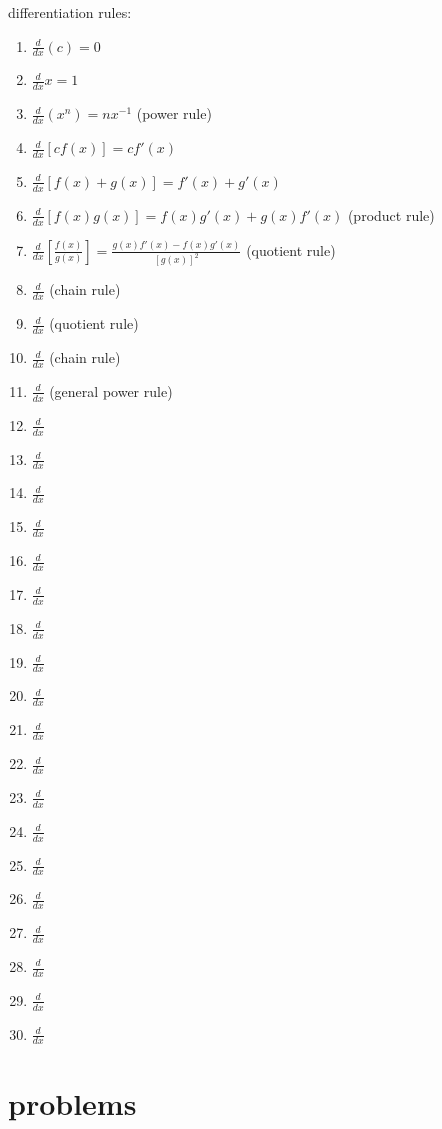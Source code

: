 \documentclass{article}
\begin{document}
differentiation rules:
	\begin{enumerate}
		\item$\frac{d}{dx}(c) = 0$
		\item$\frac{d}{dx}x = 1$
		\item$\frac{d}{dx}(x^n) = nx^{-1}$ (power rule)
		\item$\frac{d}{dx}[cf(x)] = cf'(x)$
		\item$\frac{d}{dx}[f(x)+g(x)] = f'(x) + g'(x)$
		\item$\frac{d}{dx}[f(x)g(x)] = f(x)g'(x) + g(x)f'(x)$ (product rule)
		\item$\frac{d}{dx}[\frac{f(x)}{g(x)}] = \frac{g(x)f'(x) - f(x)g'(x)}{[g(x)]^2}$ (quotient rule)
		\item$\frac{d}{dx}$ (chain rule)
		\item$\frac{d}{dx}$ (quotient rule)
		\item$\frac{d}{dx}$ (chain rule)
		\item$\frac{d}{dx}$ (general power rule)
		\item$\frac{d}{dx}$ 
		\item$\frac{d}{dx}$
		\item$\frac{d}{dx}$
		\item$\frac{d}{dx}$
		\item$\frac{d}{dx}$
		\item$\frac{d}{dx}$
		\item$\frac{d}{dx}$
		\item$\frac{d}{dx}$
		\item$\frac{d}{dx}$
		\item$\frac{d}{dx}$
		\item$\frac{d}{dx}$
		\item$\frac{d}{dx}$
		\item$\frac{d}{dx}$
		\item$\frac{d}{dx}$
		\item$\frac{d}{dx}$
		\item$\frac{d}{dx}$
		\item$\frac{d}{dx}$
		\item$\frac{d}{dx}$
		\item$\frac{d}{dx}$	
	\end{enumerate}

\newpage
\section*{problems}	
				
\end{document}
